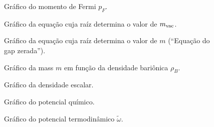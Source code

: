 
\begin{figure}
	
	\caption{Gráfico do momento de Fermi $p_F$. \protect}
	\label{Fig:fermi_momentum_NJL-Buballa_Set_1}
\end{figure}

\begin{figure}
	
	\caption{Gráfico da equação cuja raíz determina o valor de $m_{\rm{vac}}$. \protect}
	\label{Fig:vacuum_mass_equation_NJL-Buballa_Set_1}
\end{figure}

\begin{figure}
	
	\caption{Gráfico da equação cuja raíz determina o valor de $m$ (``Equação do gap zerada''). \protect}
	\label{Fig:gap_NJL-Buballa_Set_1}
\end{figure}

\begin{figure}
	
	\caption{Gráfico da mass $m$ em função da densidade bariônica $\rho_B$. \protect}
	\label{Fig:mass_NJL-Buballa_Set_1}
\end{figure}


\begin{figure}
	
	\caption{Gráfico da densidade escalar. \protect}
	\label{Fig:scalar_density_NJL-Buballa_Set_1}
\end{figure}

\begin{figure}
	
	\caption{Gráfico do potencial químico. \protect}
	\label{Fig:chemical_potential_NJL-Buballa_Set_1}
\end{figure}

\begin{figure}
	
	\caption{Gráfico do potencial termodinâmico $\tilde{\omega}$. \protect}
	\label{Fig:thermodynamic_potential_NJL-Buballa_Set_1}
\end{figure}


